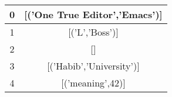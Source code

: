 \documentclass{article}
\begin{document}
\begin{enumerate}
\begin{itemize}
				\begin{center}
					\begin{tabular}{ |c|c| } 
						\hline
						0 & [('One True Editor','Emacs')]   \\ 
						\hline
						1 &	[('L','Boss')] \\
						\hline 
						2 & []  \\ 
						\hline
						3&[('Habib','University')]\\
						\hline
						4&[('meaning',42)]\\
						\hline
					\end{tabular}
				\end{center}
	\end{itemize}		
		
	\end{enumerate}
	
\end{document}
